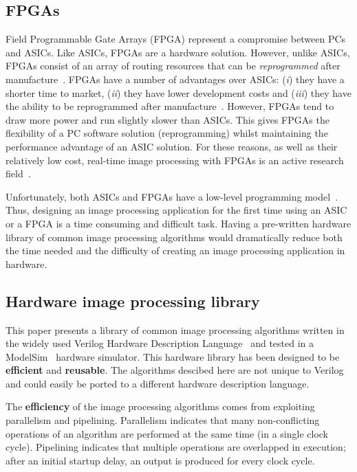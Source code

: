 \documentclass[10pt,twocolumn,letterpaper]{article}
\begin{document}
\subsection{FPGAs}
Field Programmable Gate Arrays (FPGA) represent a compromise between PCs and ASICs. Like ASICs, FPGAs are a hardware solution.
However, unlike ASICs, FPGAs consist of an array of routing resources that can be \emph{reprogrammed} after manufacture~\cite{msp05}.
FPGAs have a number of advantages over ASICs: (\emph{i}) they have a shorter time to market, (\emph{ii}) they have lower development costs 
and (\emph{iii}) they have the ability to be reprogrammed after manufacture~\cite{crookes99}. 
However, FPGAs tend to draw more power and run slightly slower than ASICs. 
This gives FPGAs the flexibility of a PC software solution (reprogramming) whilst maintaining the performance advantage of an ASIC solution.
For these reasons, as well as their relatively low cost, real-time image processing with FPGAs is an active research field~\cite{batlle2002,
kessal2003, mcbader2003}.

Unfortunately, both ASICs and FPGAs have a low-level programming model~\cite{benkrid2000}. Thus, designing an image processing
application for the first time 
using an ASIC or a FPGA 
is a time consuming and difficult task. 
Having
a pre-written hardware library of common image processing algorithms would dramatically reduce both the time needed and the difficulty of 
creating an image processing application in hardware.

\subsection{Hardware image processing library}
This paper presents a library of common image processing algorithms written in the widely used 
Verilog Hardware Description Language~\cite{thomasVerilog} 
and tested in a ModelSim~\cite{modelsim} hardware simulator.
This hardware library has been designed to be {\bf efficient} and {\bf reusable}. 
The algorithms descibed here are not unique to Verilog and could easily be ported to a 
different hardware description language. 

The {\bf efficiency} of the image processing algorithms comes from exploiting parallelism and pipelining. 
Parallelism indicates that many non-conflicting operations of an algorithm are performed at the same time (in a single clock cycle). 
Pipelining indicates that
multiple operations are overlapped in execution; after an initial startup delay, an output is produced for every clock cycle.
\end{document}
